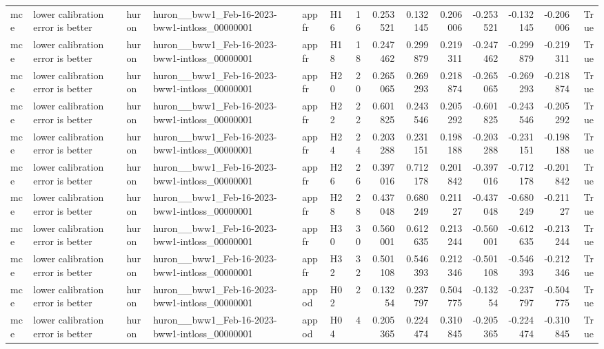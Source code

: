 \begin{longtable}{llllllrrrrrrrr}
mce & lower calibration error is better & huron & huron\_\_bww1\_Feb-16-2023-bww1-intloss\_00000001 & appfr & H16 & 16 & 0.253521 & 0.132145 & 0.206006 & -0.253521 & -0.132145 & -0.206006 & True \\
mce & lower calibration error is better & huron & huron\_\_bww1\_Feb-16-2023-bww1-intloss\_00000001 & appfr & H18 & 18 & 0.247462 & 0.299879 & 0.219311 & -0.247462 & -0.299879 & -0.219311 & True \\
mce & lower calibration error is better & huron & huron\_\_bww1\_Feb-16-2023-bww1-intloss\_00000001 & appfr & H20 & 20 & 0.265065 & 0.269293 & 0.218874 & -0.265065 & -0.269293 & -0.218874 & True \\
mce & lower calibration error is better & huron & huron\_\_bww1\_Feb-16-2023-bww1-intloss\_00000001 & appfr & H22 & 22 & 0.601825 & 0.243546 & 0.205292 & -0.601825 & -0.243546 & -0.205292 & True \\
mce & lower calibration error is better & huron & huron\_\_bww1\_Feb-16-2023-bww1-intloss\_00000001 & appfr & H24 & 24 & 0.203288 & 0.231151 & 0.198188 & -0.203288 & -0.231151 & -0.198188 & True \\
mce & lower calibration error is better & huron & huron\_\_bww1\_Feb-16-2023-bww1-intloss\_00000001 & appfr & H26 & 26 & 0.397016 & 0.712178 & 0.201842 & -0.397016 & -0.712178 & -0.201842 & True \\
mce & lower calibration error is better & huron & huron\_\_bww1\_Feb-16-2023-bww1-intloss\_00000001 & appfr & H28 & 28 & 0.437048 & 0.680249 & 0.21127 & -0.437048 & -0.680249 & -0.21127 & True \\
mce & lower calibration error is better & huron & huron\_\_bww1\_Feb-16-2023-bww1-intloss\_00000001 & appfr & H30 & 30 & 0.560001 & 0.612635 & 0.213244 & -0.560001 & -0.612635 & -0.213244 & True \\
mce & lower calibration error is better & huron & huron\_\_bww1\_Feb-16-2023-bww1-intloss\_00000001 & appfr & H32 & 32 & 0.501108 & 0.546393 & 0.212346 & -0.501108 & -0.546393 & -0.212346 & True \\
mce & lower calibration error is better & huron & huron\_\_bww1\_Feb-16-2023-bww1-intloss\_00000001 & appod & H02 & 2 & 0.13254 & 0.237797 & 0.504775 & -0.13254 & -0.237797 & -0.504775 & True \\
mce & lower calibration error is better & huron & huron\_\_bww1\_Feb-16-2023-bww1-intloss\_00000001 & appod & H04 & 4 & 0.205365 & 0.224474 & 0.310845 & -0.205365 & -0.224474 & -0.310845 & True \\

\end{longtable}
